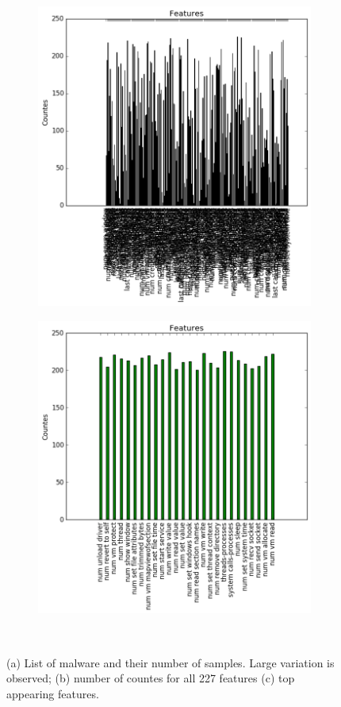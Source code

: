 \documentclass[11pt]{article}
\begin{document}
\begin{figure}[]
\begin{subfigure}[!t]{0.3\textwidth}
        \includegraphics[width=\textwidth]{Plots/Features.png}
    \end{subfigure}
            \begin{subfigure}[!t]{0.3\textwidth}
        \includegraphics[width=\textwidth]{Plots/Features_top.png}
    \end{subfigure}\\
        \caption{(a) List of malware and their number of samples. Large variation is observed; (b) number of countes for all 227 features (c) top appearing features.}
            \label{fig:Features}
\end{figure}
\end{document}
